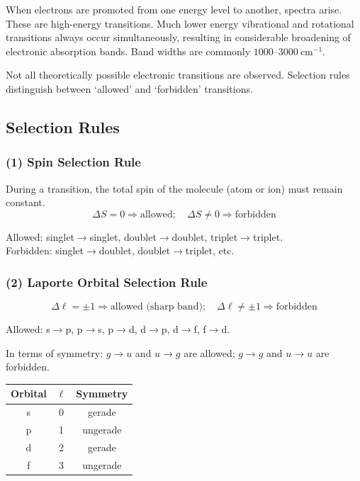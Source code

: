 \documentclass[12pt,a4paper]{article}
\begin{document}
When electrons are promoted from one energy level to another, spectra arise. These are high-energy transitions. Much lower energy vibrational and rotational transitions always occur simultaneously, resulting in considerable broadening of electronic absorption bands. Band widths are commonly $1000$--$3000\ \mathrm{cm}^{-1}$.

Not all theoretically possible electronic transitions are observed. Selection rules distinguish between `allowed' and `forbidden' transitions.

\subsection{Selection Rules}

\subsubsection{(1) Spin Selection Rule}

During a transition, the total spin of the molecule (atom or ion) must remain constant.
\[
\Delta S = 0 \Rightarrow \text{allowed}; \quad \Delta S \neq 0 \Rightarrow \text{forbidden}
\]

Allowed: singlet$\to$singlet, doublet$\to$doublet, triplet$\to$triplet.\\
Forbidden: singlet$\to$doublet, doublet$\to$triplet, etc.

\subsubsection{(2) Laporte Orbital Selection Rule}

\[
\Delta\ell = \pm1 \Rightarrow \text{allowed (sharp band)}; \quad \Delta\ell \neq \pm1 \Rightarrow \text{forbidden}
\]

Allowed: s$\to$p, p$\to$s, p$\to$d, d$\to$p, d$\to$f, f$\to$d.

In terms of symmetry: $g \to u$ and $u \to g$ are allowed; $g \to g$ and $u \to u$ are forbidden.

\begin{table}[H]
\centering
\begin{tabular}{ccc}
\toprule
Orbital & $\ell$ & Symmetry \\
\midrule
s & 0 & gerade \\
p & 1 & ungerade \\
d & 2 & gerade \\
f & 3 & ungerade \\
\bottomrule
\end{tabular}
\end{table}
\end{document}
